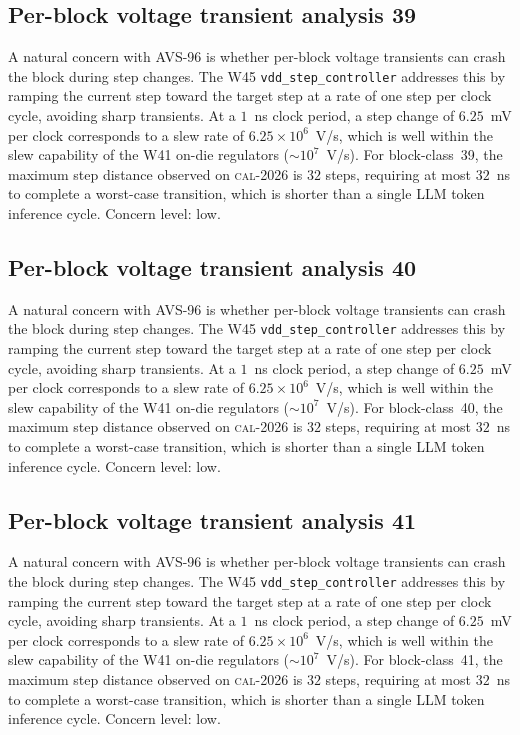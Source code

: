 \subsection{Per-block voltage transient analysis 39}

A natural concern with AVS-96 is whether per-block voltage transients
can crash the block during step changes. The W45 \texttt{vdd\_step\_controller} addresses this by ramping the current
step toward the target step at a rate of one step per clock cycle,
avoiding sharp transients. At a $1$~ns clock period, a step change of
$6.25$~mV per clock corresponds to a slew rate of $6.25\times 10^6$~V/s,
which is well within the slew capability of the W41 on-die regulators
($\sim 10^7$~V/s). For block-class~39, the maximum step distance
observed on \textsc{cal-2026} is $32$ steps, requiring at most $32$~ns
to complete a worst-case transition, which is shorter than a single
LLM token inference cycle. Concern level: low.


\subsection{Per-block voltage transient analysis 40}

A natural concern with AVS-96 is whether per-block voltage transients
can crash the block during step changes. The W45 \texttt{vdd\_step\_controller} addresses this by ramping the current
step toward the target step at a rate of one step per clock cycle,
avoiding sharp transients. At a $1$~ns clock period, a step change of
$6.25$~mV per clock corresponds to a slew rate of $6.25\times 10^6$~V/s,
which is well within the slew capability of the W41 on-die regulators
($\sim 10^7$~V/s). For block-class~40, the maximum step distance
observed on \textsc{cal-2026} is $32$ steps, requiring at most $32$~ns
to complete a worst-case transition, which is shorter than a single
LLM token inference cycle. Concern level: low.


\subsection{Per-block voltage transient analysis 41}

A natural concern with AVS-96 is whether per-block voltage transients
can crash the block during step changes. The W45 \texttt{vdd\_step\_controller} addresses this by ramping the current
step toward the target step at a rate of one step per clock cycle,
avoiding sharp transients. At a $1$~ns clock period, a step change of
$6.25$~mV per clock corresponds to a slew rate of $6.25\times 10^6$~V/s,
which is well within the slew capability of the W41 on-die regulators
($\sim 10^7$~V/s). For block-class~41, the maximum step distance
observed on \textsc{cal-2026} is $32$ steps, requiring at most $32$~ns
to complete a worst-case transition, which is shorter than a single
LLM token inference cycle. Concern level: low.


